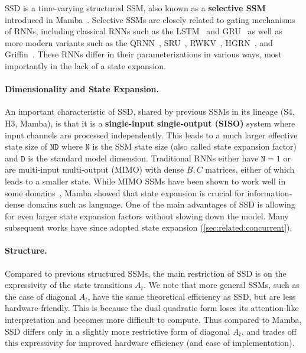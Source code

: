 SSD is a time-varying structured SSM, also known as a \textbf{selective SSM} introduced in Mamba~\citep{gu2023mamba}.
Selective SSMs are closely related to gating mechanisms of RNNs, including classical RNNs such as the LSTM~\citep{lstm} and GRU~\citep{chung2014empirical} as well as more modern variants such as the QRNN~\citep{bradbury2016quasi}, SRU~\citep{lei2017simple,lei2021attention}, RWKV~\citep{peng2023rwkv}, HGRN~\citep{qin2023hierarchically}, and Griffin~\citep{de2024griffin,botev2024recurrentgemma}.
These RNNs differ in their parameterizations in various ways, most importantly in the lack of a state expansion.

\paragraph{Dimensionality and State Expansion.} An important characteristic of SSD, shared by previous SSMs in its lineage (S4, H3, Mamba), is that it is a \textbf{single-input single-output (SISO)} system where input channels are processed independently. This leads to a much larger effective state size of $\mathtt{ND}$ where $\mathtt{N}$ is the SSM state size (also called state expansion factor) and $\mathtt{D}$ is the standard model dimension. Traditional RNNs either have $\mathtt{N}=1$ or are multi-input multi-output (MIMO) with dense $B, C$ matrices, either of which leads to a smaller state. While MIMO SSMs have been shown to work well in some domains~\citep{smith2023s5,orvieto2023resurrecting,lu2023structured}, Mamba showed that state expansion is crucial for information-dense domains such as language. One of the main advantages of SSD is allowing for even larger state expansion factors without slowing down the model. Many subsequent works have since adopted state expansion (\ref{sec:related:concurrent}).

\paragraph{Structure.}
Compared to previous structured SSMs, the main restriction of SSD is on the expressivity of the state transitions $A_t$. We note that more general SSMs, such as the case of diagonal $A_t$, have the same theoretical efficiency as SSD, but are less hardware-friendly. This is because the dual quadratic form loses its attention-like interpretation and becomes more difficult to compute. Thus compared to Mamba, SSD differs only in a slightly more restrictive form of diagonal $A_t$, and trades off this expressivity for improved hardware efficiency (and ease of implementation).

